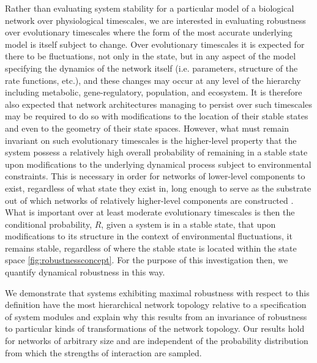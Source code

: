 Rather than evaluating system stability for a particular model of a biological network over physiological timescales, we are interested in evaluating robustness over evolutionary timescales where the form of the most accurate underlying model is itself subject to change. Over evolutionary timescales it is expected for there to be fluctuations, not only in the state, but in any aspect of the model specifying the dynamics of the network itself (i.e. parameters, structure of the rate functions, etc.), and these changes may occur at any level of the hierarchy including metabolic, gene-regulatory, population, and ecosystem. It is therefore also expected that network architectures managing to persist over such timescales may be required to do so with modifications to the location of their stable states and even to the geometry of their state spaces. However, what must remain invariant on such evolutionary timescales is the higher-level property that the system possess a relatively high overall probability of remaining in a stable state upon modifications to the underlying dynamical process subject to environmental constraints. This is necessary in order for networks of lower-level components to exist, regardless of what state they exist in, long enough to serve as the substrate out of which networks of relatively higher-level components are constructed \cite{Simon2002}. What is important over at least moderate evolutionary timescales is then the conditional probability, $R$, given a system is in a stable state, that upon modifications to its structure in the context of environmental fluctuations, it remains stable, regardless of where the stable state is located within the state space \ref{fig:robustnessconcept}. For the purpose of this investigation then, we quantify dynamical robustness in this way.

We demonstrate that systems exhibiting maximal robustness with respect to this definition have the most hierarchical network topology relative to a specification of system modules and explain why this results from an invariance of robustness to particular kinds of transformations of the network topology. Our results hold for networks of arbitrary size and are independent of the probability distribution from which the strengths of interaction are sampled.
